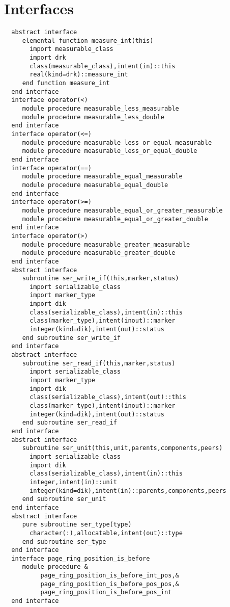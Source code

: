 \section{Interfaces}
\begin{Verbatim}
  abstract interface
     elemental function measure_int(this)
       import measurable_class
       import drk
       class(measurable_class),intent(in)::this
       real(kind=drk)::measure_int
     end function measure_int
  end interface
  interface operator(<)
     module procedure measurable_less_measurable
     module procedure measurable_less_double
  end interface
  interface operator(<=)
     module procedure measurable_less_or_equal_measurable
     module procedure measurable_less_or_equal_double
  end interface
  interface operator(==)
     module procedure measurable_equal_measurable
     module procedure measurable_equal_double
  end interface
  interface operator(>=)
     module procedure measurable_equal_or_greater_measurable
     module procedure measurable_equal_or_greater_double
  end interface
  interface operator(>)
     module procedure measurable_greater_measurable
     module procedure measurable_greater_double
  end interface
  abstract interface
     subroutine ser_write_if(this,marker,status)
       import serializable_class
       import marker_type
       import dik
       class(serializable_class),intent(in)::this
       class(marker_type),intent(inout)::marker
       integer(kind=dik),intent(out)::status
     end subroutine ser_write_if
  end interface
  abstract interface
     subroutine ser_read_if(this,marker,status)
       import serializable_class
       import marker_type
       import dik
       class(serializable_class),intent(out)::this
       class(marker_type),intent(inout)::marker
       integer(kind=dik),intent(out)::status
     end subroutine ser_read_if
  end interface
  abstract interface
     subroutine ser_unit(this,unit,parents,components,peers)
       import serializable_class
       import dik
       class(serializable_class),intent(in)::this
       integer,intent(in)::unit
       integer(kind=dik),intent(in)::parents,components,peers
     end subroutine ser_unit
  end interface
  abstract interface
     pure subroutine ser_type(type)
       character(:),allocatable,intent(out)::type
     end subroutine ser_type
  end interface
  interface page_ring_position_is_before
     module procedure &
          page_ring_position_is_before_int_pos,&
          page_ring_position_is_before_pos_pos,&
          page_ring_position_is_before_pos_int
  end interface
\end{Verbatim}
